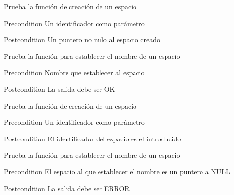 
\begin{DoxyRefList}
\item[\label{test__test000001}%
\hypertarget{test__test000001}{}%
Member \hyperlink{space__test_8h_a69278cc022dc5688d4725f8d36317b30}{test1\+\_\+space\+\_\+create} ()]Prueba la función de creación de un espacio \begin{DoxyPrecond}{Precondition}
Un identificador como parámetro 
\end{DoxyPrecond}
\begin{DoxyPostcond}{Postcondition}
Un puntero no nulo al espacio creado  
\end{DoxyPostcond}

\item[\label{test__test000003}%
\hypertarget{test__test000003}{}%
Member \hyperlink{space__test_8h_a2569bab6cfeec15f722d232bb8c78c9e}{test1\+\_\+space\+\_\+set\+\_\+name} ()]Prueba la función para establecer el nombre de un espacio \begin{DoxyPrecond}{Precondition}
Nombre que establecer al espacio 
\end{DoxyPrecond}
\begin{DoxyPostcond}{Postcondition}
La salida debe ser O\+K  
\end{DoxyPostcond}

\item[\label{test__test000002}%
\hypertarget{test__test000002}{}%
Member \hyperlink{space__test_8h_a012cd3cf37a8d91e2d7098a264c29d65}{test2\+\_\+space\+\_\+create} ()]Prueba la función de creación de un espacio \begin{DoxyPrecond}{Precondition}
Un identificador como parámetro 
\end{DoxyPrecond}
\begin{DoxyPostcond}{Postcondition}
El identificador del espacio es el introducido  
\end{DoxyPostcond}

\item[\label{test__test000004}%
\hypertarget{test__test000004}{}%
Member \hyperlink{space__test_8h_a5a868ba017602ba6b58447cb394e81a6}{test2\+\_\+space\+\_\+set\+\_\+name} ()]Prueba la función para establecer el nombre de un espacio \begin{DoxyPrecond}{Precondition}
El espacio al que establecer el nombre es un puntero a N\+U\+L\+L 
\end{DoxyPrecond}
\begin{DoxyPostcond}{Postcondition}
La salida debe ser E\+R\+R\+O\+R  
\end{DoxyPostcond}


\end{DoxyRefList}
